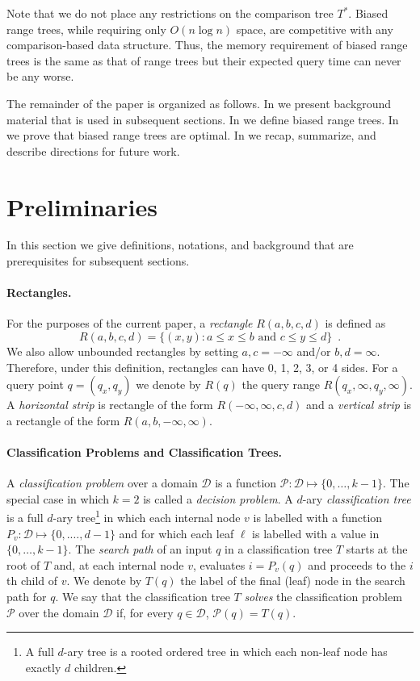 \documentclass[lotsofwhite,charterfonts]{patmorin}
\begin{document}
Note that we do not place any restrictions on the comparison tree
$T^*$.  Biased range trees, while requiring only $O(n\log n)$ space,
are competitive with any comparison-based data structure.  Thus, the
memory requirement of biased range trees is the same as that of range
trees but their expected query time can never be any worse.
 
The remainder of the paper is organized as follows. In
 we present background material that is used in
subsequent sections.  In  we define biased
range trees. In  we prove that biased range trees
are optimal.  In  we recap, summarize, and describe
directions for future work.

\section{Preliminaries}


In this section we give definitions, notations, and background
that are prerequisites for subsequent sections.

\paragraph{Rectangles.}

For the purposes of the current paper, a \emph{rectangle}
$R(a,b,c,d)$ is defined as
\[
    R(a,b,c,d) = \{ (x,y) : \mbox{$a\le  x \le b$ and $c \le y \le d$}\}
	\enspace .
\]
We also allow unbounded rectangles by setting $a,c=-\infty$ and/or
$b,d=\infty$.  Therefore, under this definition, rectangles can have
0, 1, 2, 3, or 4 sides.  For a query point $q=(q_x,q_y)$ we denote 
by $R(q)$ the query range $R(q_x,\infty,q_y,\infty)$.  A
\emph{horizontal strip} is rectangle of the form
$R(-\infty,\infty,c,d)$ and a \emph{vertical strip} is a rectangle of
the form $R(a,b,-\infty,\infty)$.

\paragraph{Classification Problems and Classification Trees.}

A \emph{classification problem} over a domain $\mathcal{D}$ is a
function $\mathcal{P}:\mathcal{D}\mapsto \{0,\ldots,k-1\}$.  The
special case in which $k=2$ is called a \emph{decision problem}.  A
$d$-ary \emph{classification tree} is a full $d$-ary tree\footnote{A
full $d$-ary tree is a rooted ordered tree in which each non-leaf node
has exactly $d$ children.} in which each internal node $v$ is labelled
with a function $P_v:\mathcal{D}\mapsto\{0,.\ldots,d-1\}$ and for
which each leaf $\ell$ is labelled with a value
in $\{0,\ldots,k-1\}$. The \emph{search path} of an input $q$
in a classification tree $T$ starts at the root of $T$ and, at each
internal node $v$, evaluates $i=P_v(q)$ and proceeds to the $i$th
child of $v$.  We denote by $T(q)$ the label of the final (leaf) node
in the search path for $q$.  We say that the classification tree $T$
\emph{solves} the classification problem $\mathcal{P}$ over the domain
$\mathcal{D}$ if, for every $q\in \mathcal{D}$, $\mathcal{P}(q)=T(q)$.
\end{document}
